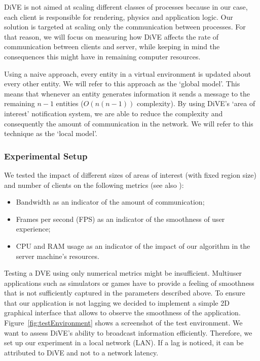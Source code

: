 \documentclass[]{elsarticle}
\begin{document}
DiVE is not aimed at scaling different classes of processes because in our case, each client is responsible for rendering, physics and application logic. Our solution is targeted at scaling only the communication between processes. For that reason, we will focus on measuring how DiVE affects the rate of communication between clients and server, while keeping in mind the consequences this might have in remaining computer resources.

Using a naive approach, every entity in a virtual environment is updated about every other entity. We will refer to this approach as the `global model'. This means that whenever an entity generates information it sends a message to the remaining $n-1$ entities ($O(n(n-1))$ complexity). By using DiVE's `area of interest' notification system, we are able to reduce the complexity and consequently the amount of communication in the network. We will refer to this technique as the `local model'.

\subsubsection{Experimental Setup}

We tested the impact of different sizes of areas of interest (with fixed region size) and number of clients on the following metrics (see also \cite{Lake+others.2010}):
\begin{itemize}
\item Bandwidth as an indicator of the amount of communication;
\item Frames per second (FPS) as an indicator of the smoothness of user experience;
\item CPU and RAM usage as an indicator of the impact of our algorithm in the server machine's resources.
\end{itemize}

Testing a DVE using only numerical metrics might be insufficient. Multiuser applications such as simulators or games have to provide a feeling of smoothness that is not sufficiently captured in the parameters described above. To ensure that our application is not lagging we decided to implement a simple 2D graphical interface that allows to observe the smoothness of the application. Figure~\ref{fig:testEnvironment} shows a screenshot of the test environment.
We want to assess DiVE's ability to broadcast information efficiently. Therefore, we set up our experiment in a local network (LAN). If a lag is noticed, it can be attributed to DiVE and not to a network latency.
\end{document}
